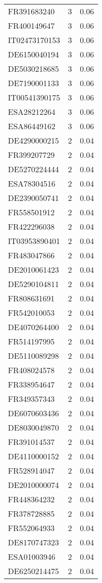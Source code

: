 \begin{table*}[htbp]
\begin{tabular}{lrr}
FR391683240 & 3 & 0.06 \\
FR400149647 & 3 & 0.06 \\
IT02473170153 & 3 & 0.06 \\
DE6150040194 & 3 & 0.06 \\
DE5030218685 & 3 & 0.06 \\
DE7190001133 & 3 & 0.06 \\
IT00541390175 & 3 & 0.06 \\
ESA28212264 & 3 & 0.06 \\
ESA86449162 & 3 & 0.06 \\
DE4290000215 & 2 & 0.04 \\
FR399207729 & 2 & 0.04 \\
DE5270224444 & 2 & 0.04 \\
ESA78304516 & 2 & 0.04 \\
DE2390050741 & 2 & 0.04 \\
FR558501912 & 2 & 0.04 \\
FR422296038 & 2 & 0.04 \\
IT03953890401 & 2 & 0.04 \\
FR483047866 & 2 & 0.04 \\
DE2010061423 & 2 & 0.04 \\
DE5290104811 & 2 & 0.04 \\
FR808631691 & 2 & 0.04 \\
FR542010053 & 2 & 0.04 \\
DE4070264400 & 2 & 0.04 \\
FR514197995 & 2 & 0.04 \\
DE5110089298 & 2 & 0.04 \\
FR408024578 & 2 & 0.04 \\
FR338954647 & 2 & 0.04 \\
FR349357343 & 2 & 0.04 \\
DE6070603436 & 2 & 0.04 \\
DE8030049870 & 2 & 0.04 \\
FR391014537 & 2 & 0.04 \\
DE4110000152 & 2 & 0.04 \\
FR528914047 & 2 & 0.04 \\
DE2010000074 & 2 & 0.04 \\
FR448364232 & 2 & 0.04 \\
FR378728885 & 2 & 0.04 \\
FR552064933 & 2 & 0.04 \\
DE8170747323 & 2 & 0.04 \\
ESA01003946 & 2 & 0.04 \\
DE6250214475 & 2 & 0.04 \\

\end{tabular}
\end{table*}
